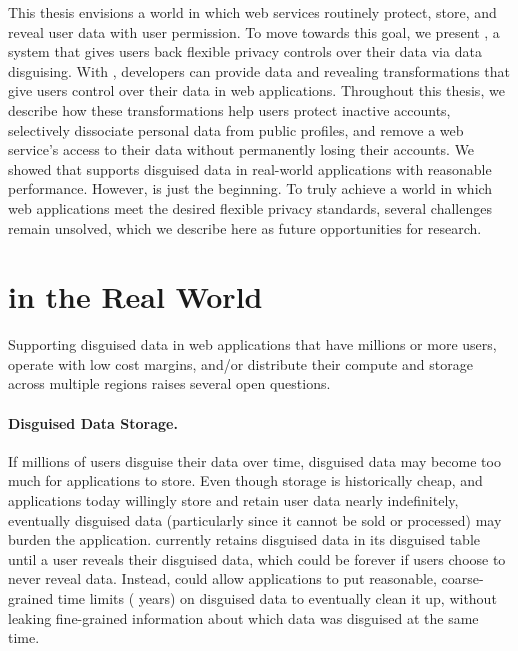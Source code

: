 This thesis envisions a world in which web services routinely
protect, store, and reveal \xxed user data with user permission.
%
To move towards this goal, we present \sys, a system that gives users back
flexible privacy controls over their data via data disguising.
%
With \sys, developers can provide data \xxing and revealing transformations that
give users control over their data in web applications.
%
Throughout this thesis, we describe how these transformations help users protect
inactive accounts, selectively dissociate personal data from public profiles,
and remove a web service's access to their data without permanently losing their
accounts.
%
We showed that \sys supports disguised data in real-world applications with
reasonable performance.
%
However, \sys is just the beginning. To truly achieve a world in which web
applications meet the desired flexible privacy standards, several
challenges remain unsolved, which we describe here as future
opportunities for research.
%

\section{\sys in the Real World}

Supporting disguised data in web applications that have millions or more users,
operate with low cost margins, and/or distribute their compute and storage
across multiple regions raises several open questions.

%
\paragraph{Disguised Data Storage.} If \eg millions of users disguise their data
over time, disguised data may become too much for applications to store.
%
Even though storage is historically cheap, and applications today willingly
store and retain user data nearly indefinitely, eventually disguised data
(particularly since it cannot be sold or processed) may burden the application.
%
\sys currently retains disguised data in its disguised table until a user
reveals their disguised data, which could be forever if users choose to never
reveal data.
%
Instead, \sys could allow applications to put reasonable, coarse-grained time
limits ( years) on disguised data to eventually clean it up, without
leaking fine-grained information about which data was disguised at the same
time.
%

%
